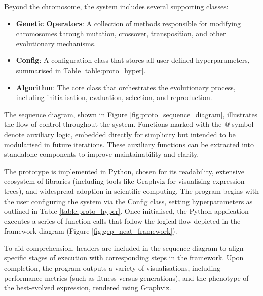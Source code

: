\parbreak\noindent Beyond the chromosome, the system includes several supporting classes:
\begin{itemize}
    \item \textbf{Genetic Operators}: A collection of methods responsible for modifying chromosomes through mutation, crossover, transposition, and other evolutionary mechanisms.
    \item \textbf{Config}: A configuration class that stores all user-defined hyperparameters, summarised in Table \ref{table:proto_hyper}.
    \item \textbf{Algorithm}: The core class that orchestrates the evolutionary process, including initialisation, evaluation, selection, and reproduction.
\end{itemize}

\parbreak\noindent The sequence diagram, shown in Figure \ref{fig:proto_sequence_diagram}, illustrates the flow of control throughout the system. Functions marked with the \textit{@} symbol denote auxiliary logic, embedded directly for simplicity but intended to be modularised in future iterations. These auxiliary functions can be extracted into standalone components to improve maintainability and clarity.

\parbreak\noindent The prototype is implemented in Python, chosen for its readability, extensive ecosystem of libraries (including tools like Graphviz for visualising expression trees), and widespread adoption in scientific computing. The program begins with the user configuring the system via the Config class, setting hyperparameters as outlined in Table \ref{table:proto_hyper}. Once initialised, the Python application executes a series of function calls that follow the logical flow depicted in the framework diagram (Figure \ref{fig:gep_neat_framework}).

\parbreak\noindent To aid comprehension, headers are included in the sequence diagram to align specific stages of execution with corresponding steps in the framework. Upon completion, the program outputs a variety of visualisations, including performance metrics (such as fitness versus generations), and the phenotype of the best-evolved expression, rendered using Graphviz.

